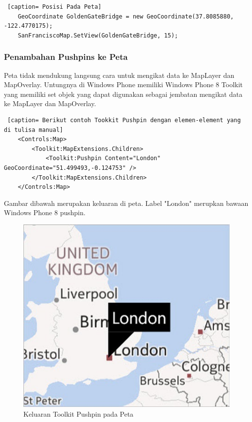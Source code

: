 \begin{lstlisting} [caption= Posisi Pada Peta]
	GeoCoordinate GoldenGateBridge = new GeoCoordinate(37.8085880, -122.4770175);
	SanFranciscoMap.SetView(GoldenGateBridge, 15);
\end{lstlisting}

\subsubsection{Penambahan Pushpins ke Peta}
\label{subsubsec:Penambahan Pushpins ke Peta}

\hspace{0.5cm} Peta tidak mendukung langsung cara untuk mengikat data ke MapLayer dan MapOverlay. Untungnya di Windows Phone memiliki Windows Phone 8 Toolkit yang memiliki set objek yang dapat digunakan sebagai jembatan mengikat data ke MapLayer dan MapOverlay.

\begin{lstlisting} [caption= Berikut contoh Tookkit Pushpin dengan elemen-element yang di tulisa manual]
	<Controls:Map>
		<Toolkit:MapExtensions.Children>
			<Toolkit:Pushpin Content="London" GeoCoordinate="51.499493,-0.124753" />
		</Toolkit:MapExtensions.Children>
	</Controls:Map>
\end{lstlisting}

\hspace{0.5cm} Gambar dibawah merupakan keluaran di peta. Label "London" merupkan bawaan Windows Phone 8 pushpin.

\begin{figure}[!h]
	\centering
		\includegraphics[scale=0.5]{Gambar/toolkit_pushpin.jpg}
	\caption{Keluaran Toolkit Pushpin pada Peta}
	\label{fig:toolkit_pushpin}
\end{figure}

